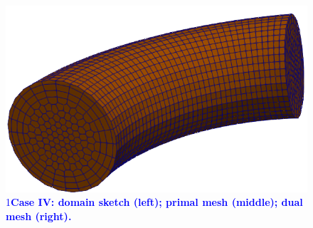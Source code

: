 \documentclass{article}
\def\ifUpdate{1}
\newcommand{\review}[1]{\textcolor{blue}{\if\ifUpdate1\textbf{#1}\fi}}
\begin{document}
\begin{figure}
    \includegraphics[scale=0.2]{paper_version/figures/dual_mesh_bend.png}
    \caption{\review{Case IV: domain sketch (left); primal mesh (middle); dual mesh (right).}}
    \label{fig:bend_domain_sketch}
\end{figure}
\end{document}
